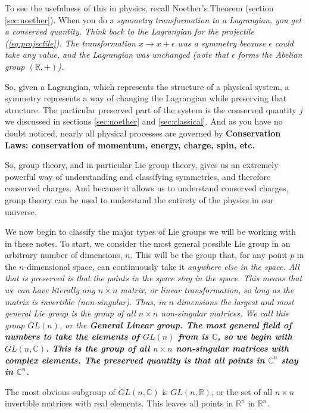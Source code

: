 \documentclass[12pt,epsf]{article}
\begin{document}
To see the usefulness of this in physics, recall Noether's Theorem
(section \ref{sec:noether}).  When you do a \it symmetry \rm
transformation to a Lagrangian, you get a conserved quantity.  Think
back to the Lagrangian for the projectile (\ref{eq:projectile}).  The
transformation $x \rightarrow x+\epsilon$ was a symmetry because
$\epsilon$ could take any value, and the Lagrangian was unchanged (note
that $\epsilon$ forms the Abelian group $(\mathbb{R},+)$).  

So, given a Lagrangian, which represents the structure of a physical
system, a symmetry represents a way of changing the Lagrangian while
preserving that structure.  The particular preserved part of the system
is the conserved quantity $j$ we discussed in sections
\ref{sec:noether} and \ref{sec:classical}.  And as you have no doubt
noticed, nearly all physical processes are governed by \bf Conservation
Laws\rm:  conservation of momentum, energy, charge, spin, etc.  

So, group theory, and in particular Lie group theory, gives us an
extremely powerful way of understanding and classifying symmetries, and
therefore conserved charges.  And because it allows us to understand
conserved charges, group theory can be used to understand the entirety
of the physics in our universe.  

We now begin to classify the major types of Lie groups we will be working
with in these notes.  To start, we consider the most general
possible Lie group in an arbitrary number of dimensions, $n$.  This
will be the group that, for any point $p$ in the $n$-dimensional space,
can continuously take it \it anywhere \rm else in the space.  All that
is preserved is that the points in the space stay in the space.
 This means that we can have literally any $n\times n$ matrix, or \it
linear \rm transformation, so long as the matrix is invertible
(non-singular).  Thus, in $n$ dimensions the largest and most general
Lie group is the group of all $n\times n$ non-singular matrices.  We
call this group $GL(n)$, or the \bf General Linear \rm group.  The most
general field of numbers to take the elements of $GL(n)$ from is
$\mathbb{C}$, so we begin with $GL(n,\mathbb{C})$.  This is the group
of all $n\times n$ non-singular matrices with complex elements.  The
preserved quantity is that all points in $\mathbb{C}^n$ stay in
$\mathbb{C}^n$.

The most obvious subgroup of $GL(n,\mathbb{C})$ is $GL(n,\mathbb{R})$,
or the set of all $n\times n$ invertible matrices with real elements. 
This leaves all points in $\mathbb{R}^n$ in $\mathbb{R}^n$.  
\end{document}
